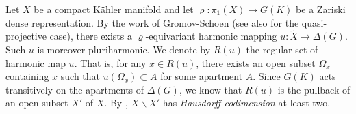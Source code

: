 \documentclass[11pt,a4paper,english]{smfart}
\theoremstyle{plain}
\theoremstyle{definition}
\theoremstyle{plain}
\begin{document}
	
	
	
Let $X$ be a compact K\"ahler manifold and 	let $\varrho:\pi_1(X)\to G(K)$ be a Zariski dense representation.   	By the work of Gromov-Schoen \cite{GS92} (see also \cite{BDDM} for the quasi-projective case), there exists a $\varrho$-equivariant harmonic mapping $u:\widetilde{X}\to \Delta(G)$.  Such $u$ is moreover pluriharmonic.  	We denote by $R(u)$ the regular set of harmonic map $u$. That is, for any $x\in R(u)$, there exists  an open subset $\Omega_{x}$ containing $x$ such that $u(\Omega_{x})\subset A$ for some apartment $A$.   
Since $G(K)$ acts transitively on the apartments of $\Delta(G)$,    we know that $R(u)$ is the pullback of an open subset $X'$ of $X$. By \cite{GS92}, $X\backslash X'$  has \emph{Hausdorff codimension} at least two.  
\end{document}
